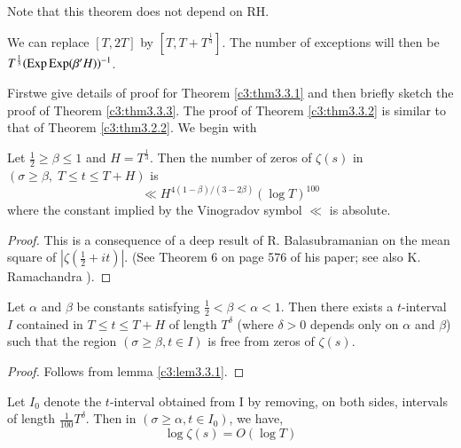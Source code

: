 \setcounter{remark}{0}
\begin{remark}%
Note that this theorem does not depend on RH.
\end{remark}

\begin{remark}%
We can replace $[T,2T]$ by $[T, T+T^{\frac{1}{3}}]$. The number of exceptions will then be $T^{\frac{1}{3}} (\operatorname{Exp} \operatorname{Exp} (\beta' H))^{-1}$.
\end{remark}

First\pageoriginale we give details of proof for Theorem \ref{c3:thm3.3.1} and then briefly sketch the proof of Theorem \ref{c3:thm3.3.3}. The proof of Theorem \ref{c3:thm3.3.2} is similar to that of Theorem \ref{c3:thm3.2.2}. We begin with

\begin{sublemma}\label{c3:lem3.3.1}
Let $\frac{1}{2} \geq \beta \leq 1$ and $H = T^{\frac{1}{3}}$. Then the number of zeros of $\zeta(s)$ in $(\sigma \geq \beta, \; T \leq t \leq T + H)$ is
\begin{equation*}
\ll H^{4(1-\beta)/(3-2\beta)} (\log T)^{100} \tag{3.3.1}\label{c3:eq3.3.1}
\end{equation*}
where the constant implied by the Vinogradov symbol $\ll$ is absolute.
\end{sublemma}

\begin{proof}
This is a consequence of a deep result of R. Balasubramanian \cite{Balasubramanian2} on the mean square of $|\zeta(\frac{1}{2} + it)|$. (See Theorem 6 on page 576 of his paper; see also K. Ramachandra \cite{Ramachandra2}).
\end{proof}

\begin{sublemma}\label{c3:lem3.3.2}
Let $\alpha$ and $\beta$ be constants satisfying $\frac{1}{2} < \beta <\alpha <1$. Then there exists a $t$-interval $I$ contained in $T \leq t \leq T + H$ of length $T^{\delta}$ (where $\delta > 0$ depends only on $\alpha$ and $\beta$) such that the region $(\sigma \geq \beta, t \in I)$ is free from zeros of $\zeta(s)$.
\end{sublemma}

\begin{proof}
Follows from lemma \ref{c3:lem3.3.1}.
\end{proof}

\begin{sublemma}\label{c3:lem3.3.3}
Let $I_0$ denote the $t$-interval obtained from I by removing, on both sides, intervals of length $\frac{1}{100} T^\delta$. Then in $(\sigma \geq \alpha, t \in I_0)$, we have,
$$
\log \zeta(s) = O(\log T)
$$
\end{sublemma}

